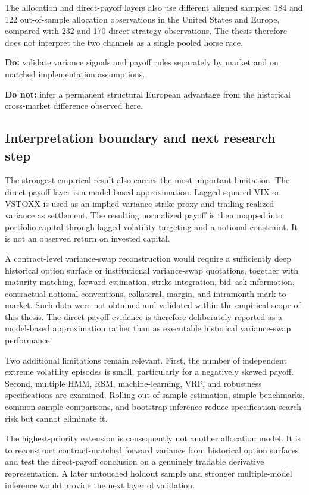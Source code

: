 The allocation and direct-payoff layers also use different aligned samples: 184 and 122
out-of-sample allocation observations in the United States and Europe, compared with 232 and
170 direct-strategy observations. The thesis therefore does not interpret the two channels as a
single pooled horse race.

\textbf{Do:} validate variance signals and payoff rules separately by market and on matched
implementation assumptions.

\textbf{Do not:} infer a permanent structural European advantage from the historical
cross-market difference observed here.

\subsection{Interpretation boundary and next research step}

The strongest empirical result also carries the most important limitation. The direct-payoff
layer is a model-based approximation. Lagged squared VIX or VSTOXX is used as an
implied-variance strike proxy and trailing realized variance as settlement. The resulting
normalized payoff is then mapped into portfolio capital through lagged volatility targeting and a
notional constraint. It is not an observed return on invested capital.

A contract-level variance-swap reconstruction would require a sufficiently deep historical
option surface or institutional variance-swap quotations, together with maturity matching,
forward estimation, strike integration, bid--ask information, contractual notional conventions,
collateral, margin, and intramonth mark-to-market. Such data were not obtained and validated
within the empirical scope of this thesis. The direct-payoff evidence is therefore deliberately
reported as a model-based approximation rather than as executable historical variance-swap
performance.

Two additional limitations remain relevant. First, the number of independent extreme
volatility episodes is small, particularly for a negatively skewed payoff. Second, multiple HMM,
RSM, machine-learning, VRP, and robustness specifications are examined. Rolling
out-of-sample estimation, simple benchmarks, common-sample comparisons, and bootstrap
inference reduce specification-search risk but cannot eliminate it.

The highest-priority extension is consequently not another allocation model. It is to reconstruct
contract-matched forward variance from historical option surfaces and test the direct-payoff
conclusion on a genuinely tradable derivative representation. A later untouched holdout sample
and stronger multiple-model inference would provide the next layer of validation.

